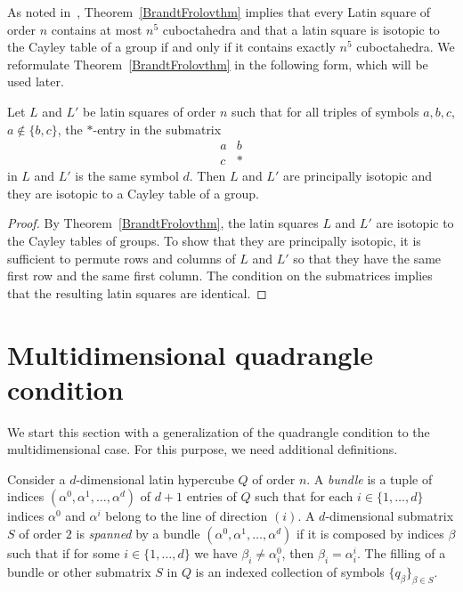 \documentclass[a4paper]{article}
\begin{document}
As noted in~\cite{GowLong.approxgroups},  Theorem~\ref{BrandtFrolovthm} implies  that every Latin square  of order $n$ contains at most $n^5$ cuboctahedra and that a  latin square  is  isotopic to the Cayley table of a group if and only if it contains exactly $n^5$ cuboctahedra. We reformulate Theorem~\ref{BrandtFrolovthm} in the following form, which will be used later.


\begin{utv} \label{cubisotop}
Let $L$ and $L'$ be latin squares of order $n$ such that  for all triples of symbols $a,b,c$, $a \notin \{b,c\}$, the  $*$-entry in the submatrix
$$
\begin{array}{cc}
a & b \\ c & *
\end{array}
$$
in $L$ and $L'$ is  the same symbol $d$. Then  $L$ and $L'$ are principally isotopic  and they  are  isotopic to a Cayley table of a group. 
\end{utv}

\begin{proof}
By Theorem~\ref{BrandtFrolovthm}, the latin squares $L$ and $L'$ are isotopic to the Cayley tables of groups. To show that they are principally isotopic, it is sufficient  to permute rows and columns of $L$ and $L'$  so that  they have the same first row and the same first column. The condition on the submatrices implies that the resulting  latin squares are identical. 
\end{proof}




\section{Multidimensional quadrangle condition} \label{maxnumbersec}


We start this section with a generalization of the quadrangle condition to the multidimensional case. For this purpose, we need additional definitions.

Consider  a $d$-dimensional latin hypercube $Q$ of order $n$.  A \textit{bundle} is a tuple of  indices $( \alpha^0, \alpha^1, \ldots, \alpha^d)$ of $d+1$ entries of $Q$ such that for each $i \in \{ 1, \ldots, d\}$  indices $\alpha^0$ and $\alpha^i$ belong to the line of direction $(i)$.   A $d$-dimensional  submatrix $S$ of order $2$ is \textit{spanned} by a bundle $( \alpha^0, \alpha^1, \ldots, \alpha^d)$ if it is composed by indices $\beta$    such that if for some $i \in \{ 1, \ldots, d\}$ we have $\beta_i \neq \alpha^0_i$, then $\beta_i = \alpha^i_i$. The filling  of a bundle or other  submatrix  $S$ in $Q$   is an indexed collection of symbols  $\{q_\beta \}_{\beta \in S}$. 
\end{document}
